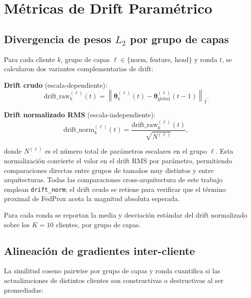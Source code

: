 \section{Métricas de Drift Paramétrico}

\subsection{\texorpdfstring{Divergencia de pesos $L_2$}{Divergencia de pesos L2} por grupo de capas}

Para cada cliente $k$, grupo de capas $\ell \in \{\text{norm, feature, head}\}$ y ronda
$t$, se calcularon dos variantes complementarias de drift:

\textbf{Drift crudo} (escala-dependiente):
\begin{equation}
  \text{drift\_raw}_k^{(\ell)}(t) =
  \left\|\boldsymbol{\theta}_k^{(\ell)}(t) - \boldsymbol{\theta}_{\text{global}}^{(\ell)}
  (t-1)\right\|_2.
  \label{eq:drift_raw}
\end{equation}

\textbf{Drift normalizado RMS} (escala-independiente):
\begin{equation}
  \text{drift\_norm}_k^{(\ell)}(t) =
  \frac{\text{drift\_raw}_k^{(\ell)}(t)}{\sqrt{N^{(\ell)}}},
  \label{eq:drift_norm}
\end{equation}

donde $N^{(\ell)}$ es el número total de parámetros escalares en el grupo $\ell$. Esta
normalización convierte el valor en el drift RMS por parámetro, permitiendo comparaciones
directas entre grupos de tamaños muy distintos y entre arquitecturas. Todas las comparaciones
cross-arquitectura de este trabajo emplean \texttt{drift\_norm}; el drift crudo se retiene
para verificar que el término proximal de FedProx acota la magnitud absoluta esperada.

Para cada ronda se reportan la media y desviación estándar del drift normalizado sobre los
$K = 10$ clientes, por grupo de capas.

\subsection{Alineación de gradientes inter-cliente}

La similitud coseno pairwise por grupo de capas y ronda cuantifica si las actualizaciones
de distintos clientes son constructivas o destructivas al ser promediadas:

